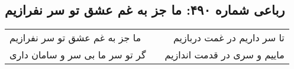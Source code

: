 \begin{center}
\section*{رباعی شماره ۴۹۰: ما جز به غم عشق تو سر نفرازیم}
\label{sec:sh490}
\begin{longtable}{l p{0.5cm} r}
ما جز به غم عشق تو سر نفرازیم
&&
تا سر داریم در غمت دربازیم
\\
گر تو سر ما بی سر و سامان داری
&&
ماییم و سری در قدمت اندازیم
\\
\end{longtable}
\end{center}
